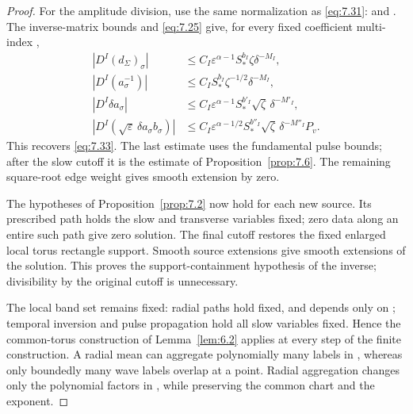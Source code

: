\begin{proof}
For the amplitude division, use the same normalization as \eqref{eq:7.31}:
 and
. The inverse-matrix bounds and
\eqref{eq:7.25} give, for every fixed coefficient multi-index ,
\[
\begin{aligned}
|D^I(d_\Sigma)_\sigma|
 &\le C_I\varepsilon^{\alpha-1}S_*^{b_I}\zeta\delta^{-M_I},\\
|D^I(a_\sigma^{-1})|
 &\le C_I S_*^{b_I}\zeta^{-1/2}\delta^{-M_I},\\
|D^I\delta a_\sigma|
 &\le C_I\varepsilon^{\alpha-1}S_*^{b'_I}\sqrt\zeta\,\delta^{-M'_I},\\
|D^I(\sqrt\varepsilon\,\delta a_\sigma b_\sigma)|
 &\le C_I\varepsilon^{\alpha-1/2}S_*^{b''_I}\sqrt\zeta\,\delta^{-M''_I}P_v.
\end{aligned}
\]
This recovers \eqref{eq:7.33}. The last estimate uses the fundamental pulse bounds; after the slow
cutoff it is the  estimate of
Proposition~\ref{prop:7.6}. The remaining square-root edge weight gives smooth extension by zero.

The hypotheses of Proposition~\ref{prop:7.2} now hold for each new source. Its prescribed path holds
the slow and transverse variables fixed; zero data along an entire such path give zero solution. The
final cutoff restores the fixed enlarged local torus rectangle support. Smooth source extensions give
smooth extensions of the solution. This proves the support-containment hypothesis of the inverse;
divisibility by the original cutoff is unnecessary.

The local band set remains fixed: radial paths hold  fixed, and
 depends only on ; temporal inversion and pulse
propagation hold all slow variables fixed. Hence the common-torus construction of
Lemma~\ref{lem:6.2} applies at every step of the finite construction. A radial mean can aggregate
polynomially many labels in , whereas only boundedly many wave labels
overlap at a point. Radial aggregation changes only the polynomial factors in
, while preserving the common chart and the
 exponent.


\end{proof}
